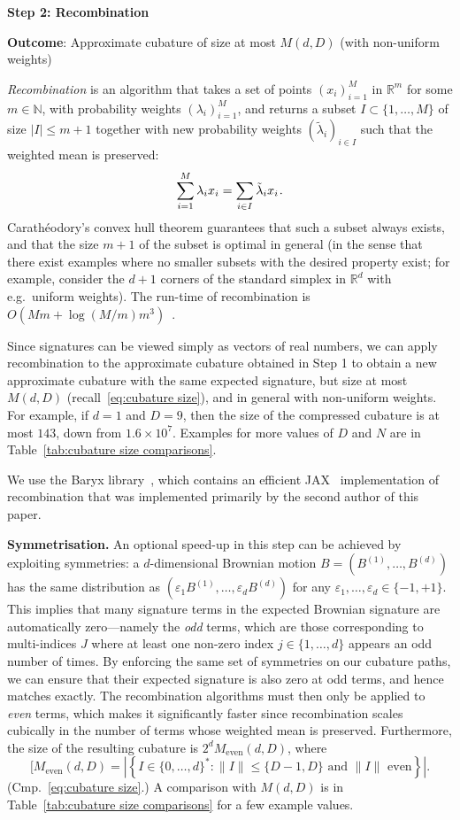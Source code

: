 \documentclass[11pt, letterpaper]{article}
\theoremstyle{definition}
\theoremstyle{remark}
\newcommand{\R}{\mathbb{R}}
\newcommand{\m}{\hspace{0.25mm}}
\newcommand{\N}{\mathbb{N}}
\begin{document}
\medskip\textbf{Step 2: Recombination}

\par\noindent\textbf{Outcome}: Approximate cubature of size at most $M(d,D)$ (with non-uniform weights)

\medskip\noindent
\emph{Recombination} \cite{litterer2012cubature,tchernychova2015cubature} is an algorithm that takes a set of points $(x_i)_{i=1}^M$ in $\R^m$ for some $m \in \N$, with probability weights $(\lambda_i)_{i=1}^M$, and returns a subset $I \subset \{1,\ldots,M\}$ of size $|I| \le m + 1$ together with new probability weights $(\tilde{\lambda}_i)_{i\in I}$ such that the weighted mean is preserved: \[
\sum_{i=1}^M \lambda_i x_i = \sum_{i\in I} \tilde{\lambda}_i x_i\m.
\]
Carath\'eodory's convex hull theorem guarantees that such a subset always exists, and that the size $m+1$ of the subset is optimal in general (in the sense that there exist examples where no smaller subsets with the desired property exist; for example, consider the $d+1$ corners of the standard simplex in $\R^d$ with e.g.\ uniform weights). The run-time of recombination is $O(Mm + \log(M / m) m^3)$~\cite[page 61]{tchernychova2015cubature}.

Since signatures can be viewed simply as vectors of real numbers, we can apply recombination to the approximate cubature obtained in Step 1 to obtain a new approximate cubature with the same expected signature, but size at most $M(d,D)$ (recall~\eqref{eq:cubature size}), and in general with non-uniform weights.
For example, if $d=1$ and $D=9$, then the size of the compressed cubature is at most $143$, down from $1.6\times 10^7$. Examples for more values of $D$ and $N$ are in Table~\ref{tab:cubature size comparisons}.

We use the Baryx library~\cite{baryx}, which contains an efficient JAX~\cite{jax2018github} implementation of recombination that was implemented primarily by the second author of this paper.

\smallskip\noindent\textbf{Symmetrisation.} An optional speed-up in this step can be achieved by exploiting symmetries: a $d$-dimensional Brownian motion $B = (B^{(1)},\ldots,B^{(d)})$ has the same distribution as $(\varepsilon_1 B^{(1)},\ldots,\varepsilon_d B^{(d)})$ for any $\varepsilon_1,\ldots,\varepsilon_d \in \{-1,+1\}$.
This implies that many signature terms in the expected Brownian signature are automatically zero---namely the \emph{odd} terms, which are those corresponding to multi-indices $J$ where at least one non-zero index $j\in \{1,\ldots,d\}$ appears an odd number of times. By enforcing the same set of symmetries on our cubature paths, we can ensure that their expected signature is also zero at odd terms, and hence matches exactly. The recombination algorithms must then only be applied to \emph{even} terms, 
which makes it significantly faster since recombination scales cubically in the number of terms whose weighted mean is preserved.
Furthermore, the size of the resulting cubature is $2^d M_\text{even}(d,D)$, where \[
[
    M_\text{even}(d,D) = \left| \left\{ I \in \{0, \ldots ,d\}^*\colon \|I\|\le \{D-1,D\} \text{ and $\|I\|$ even} \right\}  \right| .
\] (Cmp.\ \eqref{eq:cubature size}.) A comparison with $M(d,D)$ is in Table~\ref{tab:cubature size comparisons} for a few example values.
\end{document}
